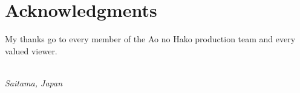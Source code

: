\chapter*{Acknowledgments}

My thanks go to every member of the Ao no Hako production team and every valued viewer.
\begin{flushright}
  {\itshape
    \gushortauthor\\
    Saitama, Japan}
\end{flushright}
